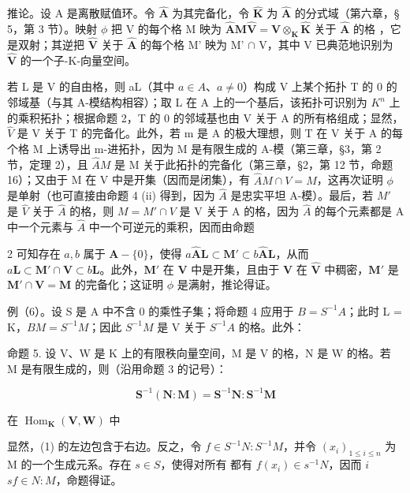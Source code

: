 推论。设 A 是离散赋值环。令 \(\hat{\mathbf{A}}\) 为其完备化，令 \(\hat{\mathbf{K}}\) 为 \(\hat{\mathbf{A}}\) 的分式域（第六章，§ 5，第 3 节）。映射 \(\phi\) 把 V 的每个格 M 映为 \(\hat{\mathbf{A}}\mathbf{M}\)\(\hat{\mathbf{V}} = \mathbf{V} \otimes_{\mathbf{K}} \hat{\mathbf{K}}\) 关于 \(\hat{\mathbf{A}}\) 的格 ，它是双射；其逆把 \(\hat{\mathbf{V}}\) 关于 \(\hat{\mathbf{A}}\) 的每个格 M' 映为 M' \(\cap\) V，其中 V 已典范地识别为 \(\hat{\mathbf{V}}\) 的一个子-K-向量空间。

若 L 是 V 的自由格，则 aL（其中 \(a \in A\)、\(a \neq 0\)）构成 V 上某个拓扑 T 的 0 的邻域基（与其 A-模结构相容）；取 L 在 A 上的一个基后，该拓扑可识别为 \(K^{n}\) 上的乘积拓扑；根据命题 2，T 的 0 的邻域基也由 V 关于 A 的所有格组成；显然，\(\hat{V}\) 是 V 关于 T 的完备化。此外，若 m 是 A 的极大理想，则 T 在 V 关于 A 的每个格 M 上诱导出 m-进拓扑，因为 M 是有限生成的 A-模（第三章，§3，第 2 节，定理 2），且 \(\hat{A}M\) 是 M 关于此拓扑的完备化（第三章，§2，第 12 节，命题 16）；又由于 M 在 V 中是开集（因而是闭集），有 \(\hat{A}M \cap V = M\)，这再次证明 \(\phi\) 是单射（也可直接由命题 4 (ii) 得到，因为 \(\hat{A}\) 是忠实平坦 A-模）。最后，若 \(M'\) 是 \(\hat{V}\) 关于 \(\hat{A}\) 的格，则 \(M = M' \cap V\) 是 V 关于 A 的格，因为 \(\hat{A}\) 的每个元素都是 A 中一个元素与 \(\hat{A}\) 中一个可逆元的乘积，因而由命题

2 可知存在 \(a, b\) 属于 \(\mathbf{A} - \{0\}\)，使得 \(a\hat{\mathbf{A}}\mathbf{L} \subset \mathbf{M}' \subset b\hat{\mathbf{A}}\mathbf{L}\)，从而 \(a\mathbf{L} \subset \mathbf{M}' \cap \mathbf{V} \subset b\mathbf{L}\)。此外，\(\mathbf{M}'\) 在 \(\mathbf{V}\) 中是开集，且由于 \(\mathbf{V}\) 在 \(\hat{\mathbf{V}}\) 中稠密，\(\mathbf{M}'\) 是 \(\mathbf{M}' \cap \mathbf{V} = \mathbf{M}\) 的完备化；这证明 \(\phi\) 是满射，推论得证。

例（6）。设 S 是 A 中不含 0 的乘性子集；将命题 4 应用于 \(B = S^{-1}A\)；此时 L = K，\(BM = S^{-1}M\)；因此 \(S^{-1}M\) 是 V 关于 \(S^{-1}A\) 的格。此外：

命题 5. 设 V、W 是 K 上的有限秩向量空间，M 是 V 的格，N 是 W 的格。若 M 是有限生成的，则（沿用命题 3 的记号）：

\[
\mathbf {S} ^ {- 1} (\mathbf {N}: \mathbf {M}) = \mathbf {S} ^ {- 1} \mathbf {N}: \mathbf {S} ^ {- 1} \mathbf {M}\tag{1}
\]

在 \(\operatorname{Hom}_{\mathbf{K}}(\mathbf{V},\mathbf{W})\) 中

显然，(1) 的左边包含于右边。反之，令 \(f \in S^{-1}N: S^{-1}M\)，并令 \((x_i)_{1 \leqslant i \leqslant n}\) 为 M 的一个生成元系。存在 \(s \in S\)，使得对所有  都有 \(f(x_i) \in s^{-1}N\)，因而 \(i\)\(sf \in N: M\)，命题得证。


